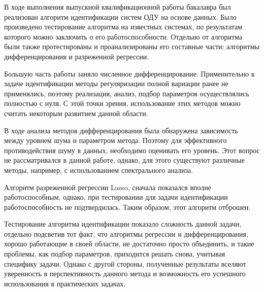 \conclusion

В ходе выполнения выпускной квалификационной работы бакалавра был реализован алгоритм идентификации систем ОДУ на основе данных. Было произведено тестирование алгоритма на известных системах, по результатам которого можно заключить о его работоспособности. Отдельно от алгоритма были также протестированы и проанализированы его составные части: алгоритмы дифференцирования и разреженной регрессии.

Большую часть работы заняло численное дифференцирование. Применительно к задаче идентификации методы регуляризации полной вариации ранее не применялись, поэтому реализация, анализ, подбор параметров осуществлялись полностью с нуля. С этой точки зрения, использование этих методов можно считать некоторым развитием данной области.

В ходе анализа методов дифференцирования была обнаружена зависимость между уровнем шума и параметром метода. Поэтому для эффективного противодействия шуму в данных, необходимо оценивать его уровень. Этот вопрос не рассматривался в данной работе, однако, для этого существуют различные методы, например, с использованием спектрального анализа.

Алгоритм разреженной регрессии Lasso, сначала показался вполне работоспособным, однако, при тестировании для задачи идентификации работоспособность не подтвердилась. Таким образом, этот алгоритм отброшен.

Тестирование алгоритма идентификации показало сложность данной задачи, отдельно подсветив тот факт, что алгоритмы регрессии и дифференцирования, хорошо работающие в своей области, не достаточно просто объединить, и такие проблемы, как подбор параметров, приходится решать снова, учитывая специфику задачи. Однако с другой стороны, полученные результаты вселяют уверенность в перспективность данного метода и возможность его успешного использования в практических задачах.